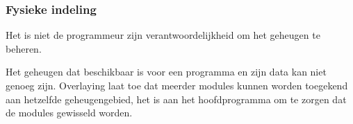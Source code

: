 \subsubsection{Fysieke indeling}

Het is niet de programmeur zijn verantwoordelijkheid om het geheugen te beheren.

Het geheugen dat beschikbaar is voor een programma en zijn data kan niet genoeg zijn. Overlaying laat toe dat meerder modules kunnen worden toegekend aan hetzelfde geheugengebied, het is aan het hoofdprogramma om te zorgen dat de modules gewisseld worden.
